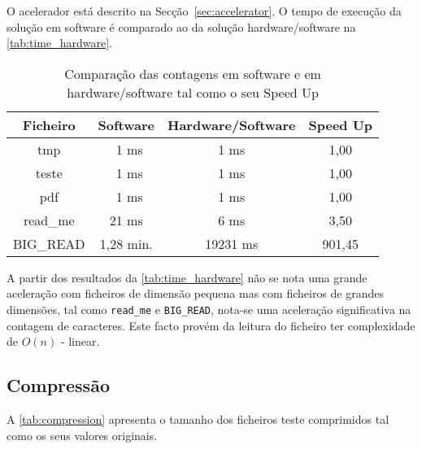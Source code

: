   O acelerador está descrito na Secção~\ref{sec:accelerator}. O tempo de execução da solução em software é comparado ao da solução hardware/software na \autoref{tab:time_hardware}.


  \begin{table}[H]
    \centering
    \caption{Comparação das contagens em software e em \\hardware/software tal como o seu Speed Up}

    \begin{tabular}{|c|c|c|c|}
      \hline
      \textbf{Ficheiro}            &
      \textbf{Software}            &
      \textbf{Hardware/Software}   &
      \textbf{Speed Up}\\ \hline \hline
      tmp        & \ 1 ms     & 1 ms              & 1,00         \\ \hline
      teste      & \ 1 ms     & 1 ms              & 1,00         \\ \hline
      pdf        & \ 1 ms     & 1 ms              & 1,00         \\ \hline
      read\_me   & 21 ms      & 6 ms              & 3,50         \\ \hline
      BIG\_READ  & 1,28 min.  & 19231 ms          & 901,45       \\
      \hline
    \end{tabular}
    \label{tab:time_hardware}
  \end{table}

  A partir dos resultados da \autoref{tab:time_hardware} não se nota uma grande aceleração com ficheiros de dimensão pequena mas com ficheiros de grandes dimensões, tal como \texttt{read\_me} e \texttt{BIG\_READ}, nota-se uma aceleração significativa na contagem de caracteres. Este facto provém da leitura do ficheiro ter complexidade de $O(n)$ - linear.

  \subsection{Compressão}

  A \autoref{tab:compression} apresenta o tamanho dos ficheiros teste comprimidos tal como os seus valores originais.

